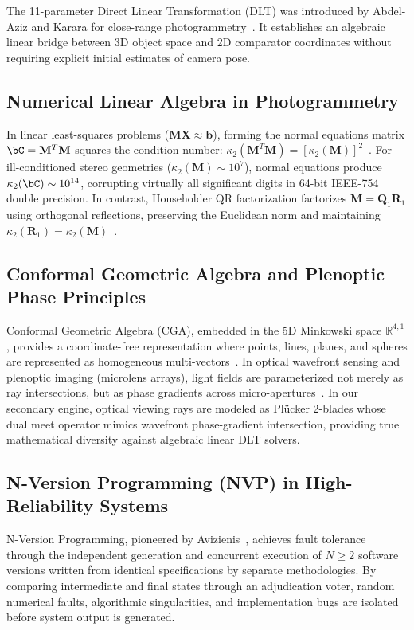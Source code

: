 \documentclass[journal]{IEEEtran}
\newcommand{\X}{\mathbf{X}}
\newcommand{\bM}{\mathbf{M}}
\newcommand{\bQ}{\mathbf{Q}}
\newcommand{\bR}{\mathbf{R}}
\newcommand{\bb}{\mathbf{b}}
\begin{document}
The 11-parameter Direct Linear Transformation (DLT) was introduced by Abdel-Aziz and Karara for close-range photogrammetry~\cite{abdel1971direct}. It establishes an algebraic linear bridge between 3D object space and 2D comparator coordinates without requiring explicit initial estimates of camera pose.

\subsection{Numerical Linear Algebra in Photogrammetry}
In linear least-squares problems ($\bM\X \approx \bb$), forming the normal equations matrix $\bC = \bM^T\bM$ squares the condition number: $\kappa_2(\bM^T\bM) = [\kappa_2(\bM)]^2$~\cite{golub2013matrix,higham2002accuracy}. For ill-conditioned stereo geometries ($\kappa_2(\bM) \sim 10^7$), normal equations produce $\kappa_2(\bC) \sim 10^{14}$, corrupting virtually all significant digits in 64-bit IEEE-754 double precision. In contrast, Householder QR factorization factorizes $\bM = \bQ_1\bR_1$ using orthogonal reflections, preserving the Euclidean norm and maintaining $\kappa_2(\bR_1) = \kappa_2(\bM)$~\cite{golub2013matrix}.

\subsection{Conformal Geometric Algebra and Plenoptic Phase Principles}
Conformal Geometric Algebra (CGA), embedded in the 5D Minkowski space $\mathbb{R}^{4,1}$, provides a coordinate-free representation where points, lines, planes, and spheres are represented as homogeneous multi-vectors~\cite{dorst2010geometric,hildenbrand2012foundations}. In optical wavefront sensing and plenoptic imaging (microlens arrays), light fields are parameterized not merely as ray intersections, but as phase gradients across micro-apertures~\cite{ng2005light}. In our secondary engine, optical viewing rays are modeled as Plücker 2-blades whose dual meet operator mimics wavefront phase-gradient intersection, providing true mathematical diversity against algebraic linear DLT solvers.

\subsection{N-Version Programming (NVP) in High-Reliability Systems}
N-Version Programming, pioneered by Avizienis~\cite{avizienis1995methodology}, achieves fault tolerance through the independent generation and concurrent execution of $N \ge 2$ software versions written from identical specifications by separate methodologies. By comparing intermediate and final states through an adjudication voter, random numerical faults, algorithmic singularities, and implementation bugs are isolated before system output is generated.
\end{document}
